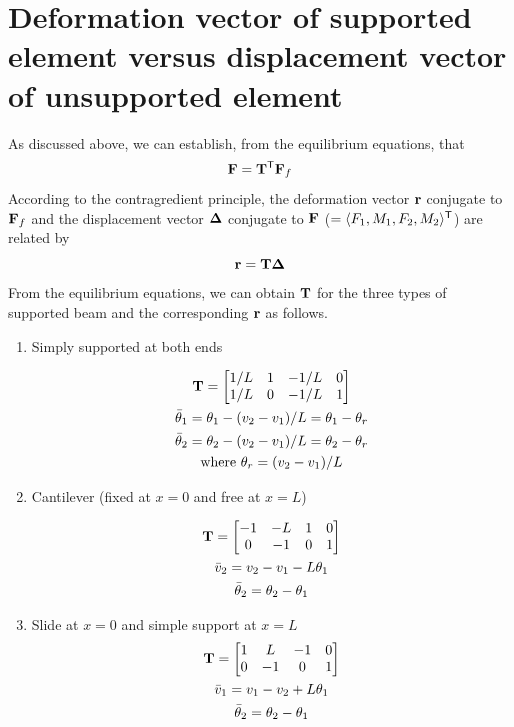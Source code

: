 \section{Deformation vector of supported element versus displacement vector of unsupported element}
As discussed above, we can establish, from the equilibrium equations, that
\begin{equation*}
  \mathbf{F} = \mathbf{T}^{\mathsf{T}}\mathbf{F}_f
\end{equation*}
According to the contragredient principle, the deformation vector $\mathbf{r}$ conjugate to $\mathbf{F}_f$ and the displacement vector $\bm{\Delta}$ conjugate to $\mathbf{F}$ ($= \langle F_1, M_1, F_2, M_2\rangle^{\mathsf{T}}$) are related by
\begin{equation*}
  \mathbf{r} = \mathbf{T}\bm{\Delta}
\end{equation*}
From the equilibrium equations, we can obtain $\mathbf{T}$ for the three types of supported beam and the corresponding $\mathbf{r}$ as follows.
\begin{enumerate}[label=(\alph*),leftmargin=*]
  \item Simply supported at both ends
    \begin{fig}
      
    \end{fig}
    \begin{gather*}
      \mathbf{T} = \begin{bmatrix}1/L & 1 & -1/L & 0\\ 1/L & 0 & -1/L & 1\end{bmatrix}\\
      \bar\theta_1 = \theta_1 - (v_2-v_1)/L = \theta_1 - \theta_r\\
      \bar\theta_2 = \theta_2 - (v_2-v_1)/L = \theta_2 - \theta_r\\
      \text{where } \theta_r = (v_2-v_1)/L
    \end{gather*}
  \item Cantilever (fixed at $x = 0$ and free at $x = L$)
    \begin{fig}
      
    \end{fig}
    \begin{gather*}
      \mathbf{T} = \begin{bmatrix}-1 & -L & 1 & 0\\ 0 & -1 & 0 & 1\end{bmatrix}\\
      \bar v_2 = v_2 - v_1 - L\theta_1\\
      \bar\theta_2 = \theta_2 - \theta_1
    \end{gather*}
  \item Slide at $x = 0$ and simple support at $x = L$
    \begin{gather*}
      \mathbf{T} = \begin{bmatrix}1 & L & -1 & 0\\ 0 & -1 & 0 & 1\end{bmatrix}\\
      \bar v_1 = v_1 - v_2 + L\theta_1\\
      \bar\theta_2 = \theta_2 - \theta_1
    \end{gather*}
\end{enumerate}
